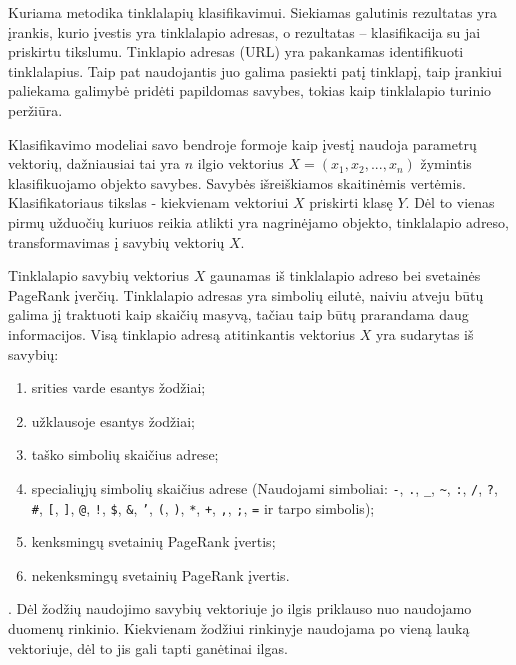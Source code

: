 Kuriama metodika tinklalapių klasifikavimui. Siekiamas galutinis rezultatas yra įrankis, kurio įvestis yra tinklalapio adresas, o rezultatas -- klasifikacija su jai priskirtu tikslumu. Tinklapio adresas (URL) yra pakankamas identifikuoti tinklalapius. Taip pat naudojantis juo galima pasiekti patį tinklapį, taip įrankiui paliekama galimybė pridėti papildomas savybes, tokias kaip tinklalapio turinio peržiūra.

Klasifikavimo modeliai savo bendroje formoje kaip įvestį naudoja parametrų vektorių, dažniausiai tai yra $n$ ilgio vektorius $X = (x_1, x_2, ... , x_n)$ žymintis klasifikuojamo objekto savybes. Savybės išreiškiamos skaitinėmis vertėmis. Klasifikatoriaus tikslas - kiekvienam vektoriui $X$ priskirti klasę $Y$. Dėl to vienas pirmų užduočių kuriuos reikia atlikti yra nagrinėjamo objekto, tinklalapio adreso, transformavimas į savybių vektorių $X$.


Tinklalapio savybių vektorius $X$ gaunamas iš tinklalapio adreso bei svetainės PageRank įverčių. Tinklalapio adresas yra simbolių eilutė, naiviu atveju būtų galima jį traktuoti kaip skaičių masyvą, tačiau taip būtų prarandama daug informacijos. Visą tinklapio adresą atitinkantis vektorius $X$ yra sudarytas iš savybių:
\begin{enumerate}
\item srities varde esantys žodžiai;
\item užklausoje esantys žodžiai;
\item taško simbolių skaičius adrese;
\item specialiųjų simbolių skaičius adrese (Naudojami simboliai:
\texttt{-},
\texttt{.},
\texttt{\_},
\texttt{\~},
\texttt{:},
\texttt{/},
\texttt{?},
\texttt{\#},
\texttt{[},
\texttt{]},
\texttt{@},
\texttt{!},
\texttt{\$},
\texttt{\&},
\texttt{'},
\texttt{(},
\texttt{)},
\texttt{*},
\texttt{+},
\texttt{,},
\texttt{;},
\texttt{=}
ir tarpo simbolis);
\item kenksmingų svetainių PageRank įvertis;
\item nekenksmingų svetainių PageRank įvertis.
\end{enumerate}.
Dėl žodžių naudojimo savybių vektoriuje jo ilgis priklauso nuo naudojamo duomenų rinkinio. Kiekvienam žodžiui rinkinyje naudojama po vieną lauką vektoriuje, dėl to jis gali tapti ganėtinai ilgas.



